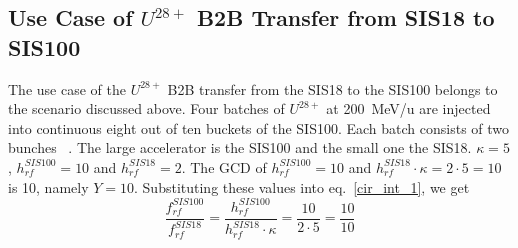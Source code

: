 
\subsection{Use Case of $U^{28+}$ B2B Transfer from SIS18 to SIS100}
\label{sec:cir_no_int}
The use case of the $U^{28+}$ B2B transfer from the SIS18 to the SIS100 belongs to the scenario discussed above. Four batches of $U^{28+}$ at \SI{200}{MeV/\atomicmassunit} are injected into continuous eight out of ten buckets of the SIS100. Each batch consists of two bunches ~\cite{liebermann_fair_2013, liebermann_sis100_2013}. The large accelerator is the SIS100 and the small one the SIS18. $\kappa=5$, $h^{\mathit{SIS100}}_\mathit{rf}=10$ and $h^{\mathit{SIS18}}_\mathit{rf}=2$. %
The GCD of $h^{\mathit{SIS100}}_\mathit{rf}=10$ and $h^{\mathit{SIS18}}_\mathit{rf} \cdot \kappa=2\cdot 5=10$ is 10, namely $Y=10$. Substituting these values into eq.~\ref{cir_int_1}, we get
\begin{equation}
\frac{f_{\mathit{rf}}^{\mathit{SIS100}}}{f_{\mathit{rf}}^{\mathit{SIS18}}}= \frac {h^{\mathit{SIS100}}_\mathit{rf}}{h^{\mathit{SIS18}}_\mathit{rf} \cdot \kappa}= \frac{10}{2 \cdot 5}=\frac{10}{10}
\end{equation}


